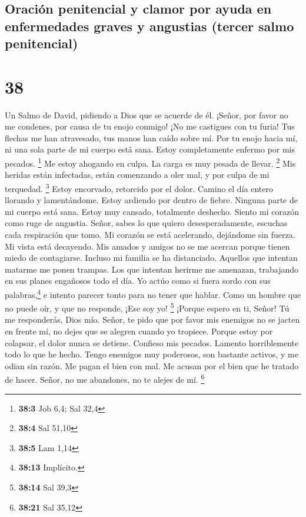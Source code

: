 \hypertarget{oraciuxf3n-penitencial-y-clamor-por-ayuda-en-enfermedades-graves-y-angustias-tercer-salmo-penitencial}{%
\subsection{Oración penitencial y clamor por ayuda en enfermedades
graves y angustias (tercer salmo
penitencial)}\label{oraciuxf3n-penitencial-y-clamor-por-ayuda-en-enfermedades-graves-y-angustias-tercer-salmo-penitencial}}

\hypertarget{section-37}{%
\section{38}\label{section-37}}

Un Salmo de David, pidiendo a Dios que se acuerde de él. 
¡Señor, por favor no me condenes, por causa de tu enojo conmigo! ¡No me
castigues con tu furia!  Tus flechas me han atravesado,
tus manos han caído sobre mí.  Por tu enojo hacia mí, ni
una sola parte de mi cuerpo está sana. Estoy completamente enfermo por
mis pecados. \footnote{\textbf{38:3} Job 6,4; Sal 32,4} 
Me estoy ahogando en culpa. La carga es muy pesada de llevar.
\footnote{\textbf{38:4} Sal 51,10}  Mis heridas están
infectadas, están comenzando a oler mal, y por culpa de mi terquedad.
\footnote{\textbf{38:5} Lam 1,14}  Estoy encorvado,
retorcido por el dolor. Camino el día entero llorando y lamentándome.
 Estoy ardiendo por dentro de fiebre. Ninguna parte de mi
cuerpo está sana.  Estoy muy cansado, totalmente deshecho.
Siento mi corazón como ruge de angustia.  Señor, sabes lo
que quiero desesperadamente, escuchas cada respiración que tomo.
 Mi corazón se está acelerando, dejándome sin fuerza. Mi
vista está decayendo.  Mis amados y amigos no se me
acercan porque tienen miedo de contagiarse. Incluso mi familia se ha
distanciado.  Aquellos que intentan matarme me ponen
trampas. Los que intentan herirme me amenazan, trabajando en sus planes
engañosos todo el día.  Yo actúo como si fuera sordo con
sus palabras,\footnote{\textbf{38:13} Implícito.} e intento parecer
tonto para no tener que hablar.  Como un hombre que no
puede oír, y que no responde, ¡Ese soy yo! \footnote{\textbf{38:14} Sal
  39,3}  ¡Porque espero en ti, Señor! Tú me responderás,
Dios mío.  Señor, te pido que por favor mis enemigos no
se jacten en frente mí, no dejes que se alegren cuando yo tropiece.
 Porque estoy por colapsar, el dolor nunca se detiene.
 Confieso mis pecados. Lamento horriblemente todo lo que
he hecho.  Tengo enemigos muy poderosos, son bastante
activos, y me odian sin razón.  Me pagan el bien con mal.
Me acusan por el bien que he tratado de hacer.  Señor, no
me abandones, no te alejes de mí. \footnote{\textbf{38:21} Sal 35,12}

